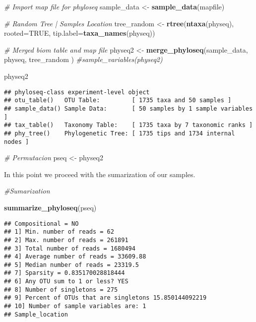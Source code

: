 \documentclass[]{article}
\newenvironment{Shaded}{\begin{snugshade}}{\end{snugshade}}
\newcommand{\CommentTok}[1]{\textcolor[rgb]{0.56,0.35,0.01}{\textit{#1}}}
\newcommand{\DataTypeTok}[1]{\textcolor[rgb]{0.13,0.29,0.53}{#1}}
\newcommand{\KeywordTok}[1]{\textcolor[rgb]{0.13,0.29,0.53}{\textbf{#1}}}
\newcommand{\NormalTok}[1]{#1}
\newcommand{\OtherTok}[1]{\textcolor[rgb]{0.56,0.35,0.01}{#1}}
\newcommand{\StringTok}[1]{\textcolor[rgb]{0.31,0.60,0.02}{#1}}
\begin{document}
\begin{Shaded}
\begin{Highlighting}[]
\CommentTok{# Import map file for phyloseq}
\NormalTok{sample_data <-}\StringTok{ }\KeywordTok{sample_data}\NormalTok{(mapfile)}

\CommentTok{# Random Tree | Samples Location}
\NormalTok{tree_random <-}\StringTok{ }\KeywordTok{rtree}\NormalTok{(}\KeywordTok{ntaxa}\NormalTok{(physeq), }\DataTypeTok{rooted=}\OtherTok{TRUE}\NormalTok{, }\DataTypeTok{tip.label=}\KeywordTok{taxa_names}\NormalTok{(physeq))}

\CommentTok{# Merged biom table and map file}
\NormalTok{physeq2 <-}\StringTok{ }\KeywordTok{merge_phyloseq}\NormalTok{(sample_data, physeq, tree_random )}
\CommentTok{#sample_variables(physeq2)}

\NormalTok{physeq2}
\end{Highlighting}
\end{Shaded}

\begin{verbatim}
## phyloseq-class experiment-level object
## otu_table()   OTU Table:         [ 1735 taxa and 50 samples ]
## sample_data() Sample Data:       [ 50 samples by 1 sample variables ]
## tax_table()   Taxonomy Table:    [ 1735 taxa by 7 taxonomic ranks ]
## phy_tree()    Phylogenetic Tree: [ 1735 tips and 1734 internal nodes ]
\end{verbatim}

\begin{Shaded}
\begin{Highlighting}[]
\CommentTok{# Permutacion}
\NormalTok{pseq <-}\StringTok{ }\NormalTok{physeq2}
\end{Highlighting}
\end{Shaded}

In this point we proceed with the sumarization of our samples.

\begin{Shaded}
\begin{Highlighting}[]
\CommentTok{#Sumarization}

\KeywordTok{summarize_phyloseq}\NormalTok{(pseq)}
\end{Highlighting}
\end{Shaded}

\begin{verbatim}
## Compositional = NO
## 1] Min. number of reads = 62 
## 2] Max. number of reads = 261891 
## 3] Total number of reads = 1680494 
## 4] Average number of reads = 33609.88 
## 5] Median number of reads = 23319.5 
## 7] Sparsity = 0.835170028818444 
## 6] Any OTU sum to 1 or less? YES 
## 8] Number of singletons = 275 
## 9] Percent of OTUs that are singletons 15.850144092219 
## 10] Number of sample variables are: 1 
## Sample_location
\end{verbatim}
\end{document}
